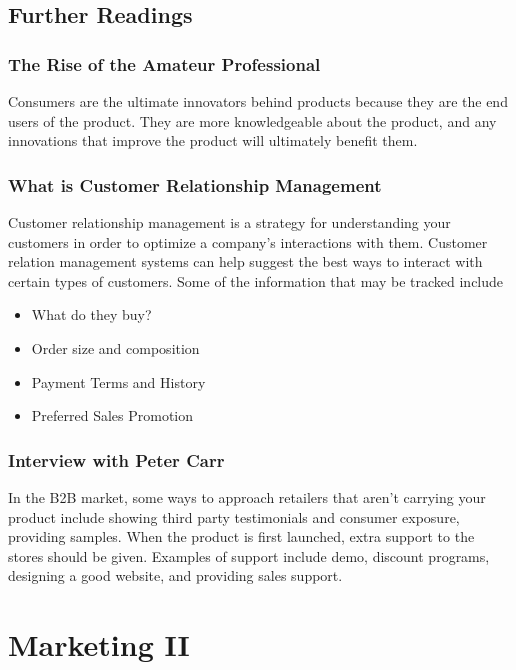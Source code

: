 \documentclass[english, 12pt]{article}
\begin{document}
\subsection*{Further Readings}
\subsubsection*{The Rise of the Amateur Professional}
Consumers are the ultimate innovators behind products because they are the end users of the product. They are more knowledgeable about the product, and any innovations that improve the product will ultimately benefit them.
\subsubsection*{What is Customer Relationship Management}
Customer relationship management is a strategy for understanding your customers in order to optimize a company's interactions with them. Customer relation management systems can help suggest the best ways to interact with certain types of customers. Some of the information that may be tracked include
\begin{itemize}
\item What do they buy?
\item Order size and composition
\item Payment Terms and History
\item Preferred Sales Promotion
\end{itemize}
\subsubsection*{Interview with Peter Carr}
In the B2B market, some ways to approach retailers that aren't carrying your product include showing third party testimonials and consumer exposure, providing samples. When the product is first launched, extra support to the stores should be given. Examples of support include demo, discount programs, designing a good website, and providing sales support.
\section{Marketing II}
\end{document}

